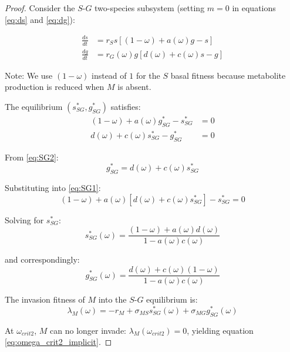 \documentclass[11pt]{article}
\begin{document}
\begin{proof}
Consider the $S$-$G$ two-species subsystem (setting $m = 0$ in equations \eqref{eq:ds} and \eqref{eq:dg}):

\begin{align}
\frac{ds}{dt} &= r_S s \left[(1-\omega) + a(\omega) g - s\right] \\
\frac{dg}{dt} &= r_G(\omega) g \left[d(\omega) + c(\omega) s - g\right]
\end{align}

Note: We use $(1-\omega)$ instead of $1$ for the $S$ basal fitness because metabolite production is reduced when $M$ is absent.

The equilibrium $(s^*_{SG}, g^*_{SG})$ satisfies:
\begin{align}
(1-\omega) + a(\omega) g^*_{SG} - s^*_{SG} &= 0 \label{eq:SG1}\\
d(\omega) + c(\omega) s^*_{SG} - g^*_{SG} &= 0 \label{eq:SG2}
\end{align}

From \eqref{eq:SG2}:
\begin{equation}
g^*_{SG} = d(\omega) + c(\omega) s^*_{SG}
\end{equation}

Substituting into \eqref{eq:SG1}:
\begin{equation}
(1-\omega) + a(\omega)[d(\omega) + c(\omega) s^*_{SG}] - s^*_{SG} = 0
\end{equation}

Solving for $s^*_{SG}$:
\begin{equation}
s^*_{SG}(\omega) = \frac{(1-\omega) + a(\omega) d(\omega)}{1 - a(\omega) c(\omega)}
\label{eq:sSG}
\end{equation}

and correspondingly:
\begin{equation}
g^*_{SG}(\omega) = \frac{d(\omega) + c(\omega)(1-\omega)}{1 - a(\omega) c(\omega)}
\label{eq:gSG}
\end{equation}

The invasion fitness of $M$ into the $S$-$G$ equilibrium is:
\begin{equation}
\lambda_M(\omega) = -r_M + \sigma_{MS} s^*_{SG}(\omega) + \sigma_{MG} g^*_{SG}(\omega)
\end{equation}

At $\omega_{crit2}$, $M$ can no longer invade: $\lambda_M(\omega_{crit2}) = 0$, yielding equation \eqref{eq:omega_crit2_implicit}.
\end{proof}
\end{document}
